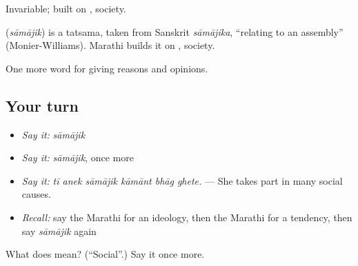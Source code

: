 Invariable; built on , society.

\begin{cousinweb}
\textbf{} (\emph{sāmājik}) is a tatsama, taken from Sanskrit \emph{sāmājika}, \textquotedblleft{}relating to an assembly\textquotedblright{} (Monier-Williams). Marathi builds it on , society.
\end{cousinweb}

\begin{grammarlens}[title={What you've built}]
One more word for giving reasons and opinions.
\end{grammarlens}

\subsection*{Your turn}
\begin{itemize}
\raggedright
  \item \emph{Say it:} \emph{sāmājik}
  \item \emph{Say it:} \emph{sāmājik}, once more
  \item \emph{Say it:} \emph{tī anek sāmājik kāmānt bhāg ghete.} — She takes part in many social causes.
  \item \emph{Recall:} say the Marathi for an ideology, then the Marathi for a tendency, then say \emph{sāmājik} again
\end{itemize}

\begin{tcolorbox}[breakable,colback=teal!4,colframe=teal!35!black,title={Before you move on}]
What does  mean? (\textquotedblleft{}Social\textquotedblright{}.) Say it once more.
\end{tcolorbox}
